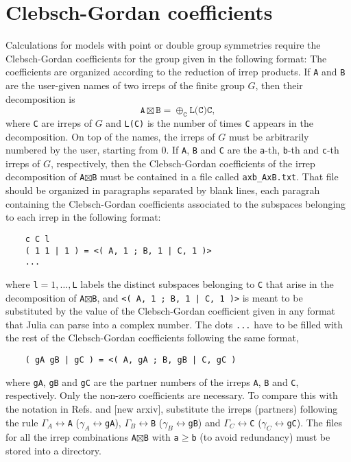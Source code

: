 \documentclass[notitlepage]{article}
\begin{document}
\section{Clebsch-Gordan coefficients}\label{clebsch-gordan}
Calculations for models with point or double group
symmetries require the Clebsch-Gordan coefficients for the
group given in the following format: The coefficients are
organized according to the reduction of irrep products. If
\texttt{A} and \texttt{B} are the user-given names of two
irreps of the finite group $G$, then their decomposition is
\begin{equation}
    \texttt{A} \boxtimes \texttt{B}
    =
    \oplus_\texttt{C} \texttt{L(C)} \texttt{C},
\label{eq:A_times_B}
\end{equation}
where \texttt{C} are irreps of $G$ and \texttt{L(C)} is the
number of times \texttt{C} appears in the decomposition. On
top of the names, the irreps of $G$ must be arbitrarily
numbered by the user, starting from 0. If \texttt{A},
\texttt{B} and \texttt{C} are the \texttt{a}-th,
\texttt{b}-th and \texttt{c}-th irreps of $G$, respectively,
then the Clebsch-Gordan coefficients of the irrep
decomposition of \texttt{A}$\boxtimes$\texttt{B} must be
contained in a file called \texttt{axb\_AxB.txt}. That file
should be organized in paragraphs separated by blank lines,
each paragrah containing the Clebsch-Gordan coefficients
associated to the subspaces belonging to each irrep in the
following format:
\begin{verbatim}
    c C l
    ( 1 1 | 1 ) = <( A, 1 ; B, 1 | C, 1 )>
    ...
\end{verbatim}
where \texttt{l}$=1,\dots,$\texttt{L} labels the distinct
subspaces belonging to \texttt{C} that arise in the
decomposition of \texttt{A}$\boxtimes$\texttt{B},  and
\texttt{<( A, 1 ; B, 1 | C, 1 )>} is meant to be substituted by
the value of the Clebsch-Gordan coefficient given in any
format that Julia can parse into a complex number. The dots
\texttt{...} have to be filled with the rest of the
Clebsch-Gordan coefficients following the same format,
\begin{verbatim}
    ( gA gB | gC ) = <( A, gA ; B, gB | C, gC )
\end{verbatim}
where \texttt{gA}, \texttt{gB} and \texttt{gC} are the
partner numbers of the irreps \texttt{A}, \texttt{B} and
\texttt{C}, respectively. Only the non-zero coefficients are
necessary. To compare this with the notation in Refs.
\cite{calvo-fernandez2024} and [new arxiv], substitute the
irreps (partners) following the rule
$\Gamma_A\leftrightarrow$\texttt{A}
($\gamma_A\leftrightarrow$\texttt{gA}),
$\Gamma_B\leftrightarrow$\texttt{B}
($\gamma_B\leftrightarrow$\texttt{gB}) and
$\Gamma_C\leftrightarrow$\texttt{C}
($\gamma_C\leftrightarrow$\texttt{gC}). The files for all
the irrep combinations \texttt{A}$\boxtimes$\texttt{B} with
\texttt{a}$\geq$\texttt{b} (to avoid redundancy) must be
stored into a directory. 
\end{document}
